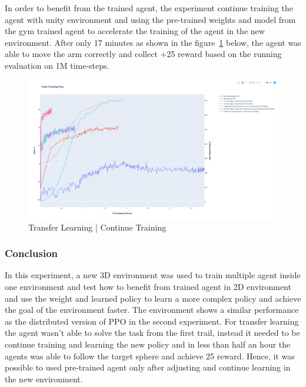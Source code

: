 In order to benefit from the trained agent, the experiment continue training the agent with unity environment and using the pre-trained weights and model from the gym trained agent to accelerate the training of the agent in the new environment. After only 17 minutes as shown in the figure~\ref{fig:4th_exp_2nd_transfer_learning} below, the agent was able to move the arm correctly and collect +25 reward based on the running evaluation on 1M time-steps.
\begin{figure}[!htb]
		\centering
		\includegraphics[width=\linewidth]{figures/exps/4th_exp/2nd_transfer_learning.png}
		\caption{Transfer Learning | Continue Training}
		\label{fig:4th_exp_2nd_transfer_learning}
\end{figure}



\subsubsection{Conclusion}

In this experiment, a new 3D environment was used to train multiple agent inside one environment and test how to benefit from trained agent in 2D environment and use the weight and learned policy to learn a more complex policy and achieve the goal of the environment faster. The environment shows a similar performance as the distributed version of PPO in the second experiment. For transfer learning the agent wasn't able to solve the task from the first trail, instead it needed to be continue training and learning the new policy and in less than half an hour the agents was able to follow the target sphere and achieve 25 reward. Hence, it was possible to used pre-trained agent only after adjusting and continue learning in the new environment.